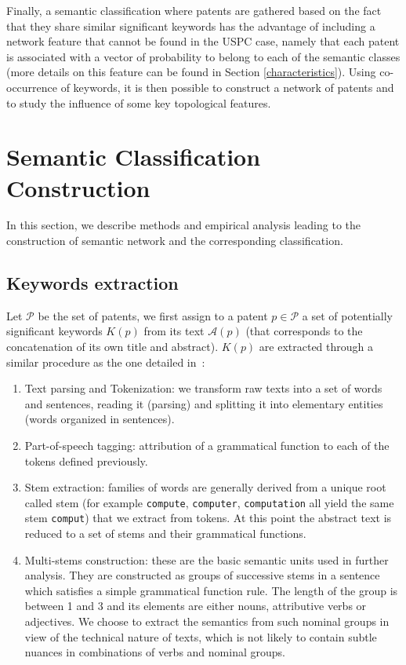 \documentclass[10pt,A4,draft]{article}
\begin{document}
Finally, a semantic classification where patents are gathered based on the fact that they share similar significant keywords has the advantage of including a network feature that cannot be found in the USPC case, namely that each patent is associated with a vector of probability to belong to each of the semantic classes (more details on this feature can be found in Section \ref{characteristics}). Using co-occurrence of keywords, it is then possible to construct a network of patents and to study the influence of some key topological features.

\section{Semantic Classification Construction \label{keywords}}

In this section, we describe methods and empirical analysis leading to the construction of semantic network and the corresponding classification. 

\subsection{Keywords extraction}
\label{keywordsextraction}

Let $\mathcal{P}$ be the set of patents, we first assign to a patent $p\in \mathcal{P}$ a set of potentially significant keywords $K(p)$ from its text ${\mathcal{A}}(p)$ (that corresponds to the concatenation of its own title and abstract).
$K(p)$ are extracted through a similar procedure as the one detailed in~\cite{chavalarias2013phylomemetic}: 
\begin{enumerate}
\item Text parsing and Tokenization: we transform raw texts into a set of words and sentences, reading it (parsing) and splitting it into elementary entities (words organized in sentences).

\item Part-of-speech tagging: attribution of a grammatical function to each of the tokens defined previously.

\item Stem extraction: families of words are generally derived from a unique root called stem (for example \texttt{compute}, \texttt{computer}, \texttt{computation} all yield the same stem \texttt{comput}) that we extract from tokens. At this point the abstract text is reduced to a set of stems and their grammatical functions.
\item Multi-stems construction: these are the basic semantic units used in further analysis. They are constructed as groups of successive stems in a sentence which satisfies a simple grammatical function rule. The length of the group is between 1 and 3 and its elements are either nouns, attributive verbs or adjectives. We choose to extract the semantics from such nominal groups in view of the technical nature of texts, which is not likely to contain subtle nuances in combinations of verbs and nominal groups.
\end{enumerate}
\end{document}
